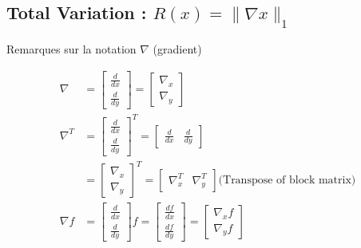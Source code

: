 \subsection{Total Variation : $R(x) = \lVert \nabla x \rVert_{1}$}

\frame{
    \tableofcontents[ 
        currentsubsection, 
    ]
}

\begin{frame}{Remarques sur la notation $\nabla$ (gradient)}


\begin{align*}
\nabla 
&= \begin{bmatrix} \frac{d}{dx} \\ \frac{d}{dy} \end{bmatrix}
= \begin{bmatrix} \nabla_{x} \\ \nabla_{y} \end{bmatrix} \\
\nabla^{T}
&= \begin{bmatrix} \frac{d}{dx} \\ \frac{d}{dy} \end{bmatrix}^{T}
= \begin{bmatrix} \frac{d}{dx} & \frac{d}{dy} \end{bmatrix} \\
&= \begin{bmatrix} \nabla_{x} \\ \nabla_{y} \end{bmatrix}^{T}
= \begin{bmatrix} \nabla_{x}^{T} & \nabla_{y}^{T} \end{bmatrix} 
\text{(Transpose of block matrix)} \\
\nabla f 
&= \begin{bmatrix} \frac{d}{dx} \\ \frac{d}{dy} \end{bmatrix} f 
= \begin{bmatrix} \frac{df}{dx} \\ \frac{df}{dy} \end{bmatrix}
= \begin{bmatrix} \nabla_{x}f \\ \nabla_{y}f \end{bmatrix}
\end{align*}


\end{frame}


